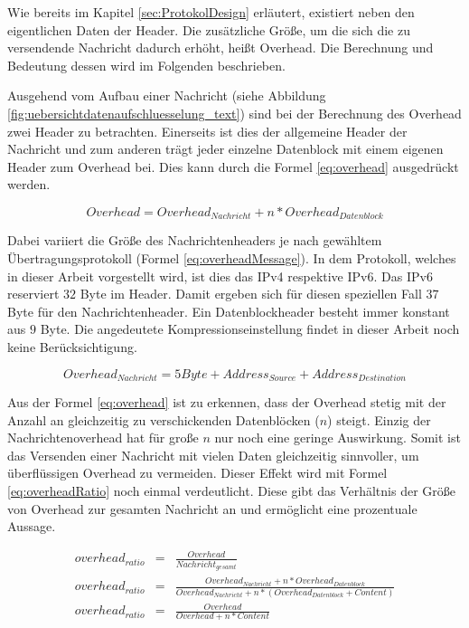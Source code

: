 Wie bereits im Kapitel \ref{sec:ProtokolDesign} erläutert, existiert neben den
eigentlichen Daten der Header. Die zusätzliche Größe, um die sich die
zu versendende Nachricht dadurch erhöht, heißt Overhead. Die Berechnung und
Bedeutung dessen wird im Folgenden beschrieben.

Ausgehend vom Aufbau einer Nachricht (siehe Abbildung
\ref{fig:uebersichtdatenaufschluesselung_text}) sind bei der Berechnung des
Overhead zwei Header zu betrachten. Einerseits ist dies der allgemeine Header der
Nachricht und zum anderen trägt jeder einzelne Datenblock
mit einem eigenen Header zum Overhead bei. Dies kann durch die Formel
\ref{eq:overhead} ausgedrückt werden.

\begin{equation}
	Overhead = Overhead_{Nachricht} + n * Overhead_{Datenblock}
	\label{eq:overhead}
\end{equation}

Dabei variiert die Größe des Nachrichtenheaders je nach gewähltem
Übertragungsprotokoll (Formel \ref{eq:overheadMessage}). In dem Protokoll,
welches in dieser Arbeit vorgestellt wird, ist dies das IPv4 respektive IPv6.
Das IPv6 reserviert $32$ Byte im Header. Damit ergeben sich für diesen speziellen
Fall $37$ Byte für den Nachrichtenheader. Ein Datenblockheader besteht immer
konstant aus $9$ Byte.
Die angedeutete Kompressionseinstellung findet in dieser Arbeit noch
keine Berücksichtigung.

\begin{equation}
	Overhead_{Nachricht} = 5 Byte + Address_{Source} + Address_{Destination}
	\label{eq:overheadMessage}
\end{equation}

Aus der Formel \ref{eq:overhead} ist zu erkennen, dass der Overhead
stetig mit der Anzahl an gleichzeitig zu verschickenden Datenblöcken ($n$)
steigt. Einzig der Nachrichtenoverhead hat für große $n$ nur noch eine
geringe Auswirkung. Somit ist das Versenden einer Nachricht mit vielen Daten
gleichzeitig sinnvoller, um überflüssigen Overhead zu vermeiden. Dieser
Effekt wird mit Formel \ref{eq:overheadRatio} noch einmal verdeutlicht. Diese
gibt das Verhältnis der Größe von Overhead zur gesamten Nachricht an und
ermöglicht eine prozentuale Aussage.

\begin{eqnarray} 
	overhead_{ratio} & = & \frac{Overhead}{Nachricht_{gesamt}}\\
	overhead_{ratio} & = & \frac{Overhead_{Nachricht} + n * Overhead_{Datenblock}}{Overhead_{Nachricht} + n * (Overhead_{Datenblock} + Content)}\\
	overhead_{ratio} & = & \frac{Overhead}{Overhead + n * Content}
	\label{eq:overheadRatio}
\end{eqnarray}

